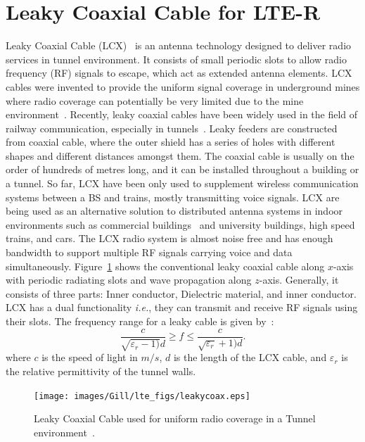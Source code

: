 \section{Leaky Coaxial Cable for LTE-R}
Leaky Coaxial Cable (LCX)~\cite{n1974leaky} is an antenna technology designed to deliver radio services in tunnel environment. It consists of small periodic slots to allow radio frequency (RF) signals to escape, which act as extended antenna elements. LCX cables were invented to provide the uniform signal coverage in underground mines where radio coverage can potentially be very limited due to the mine environment~\cite{arlter10}. Recently, leaky coaxial cables have been widely used in the field of railway communication, especially in tunnels~\cite{arlter10}. Leaky feeders are
constructed from coaxial cable, where the outer shield has a series of holes with different shapes and different distances amongst them. The coaxial cable is usually on the order of hundreds of metres long, and it can be installed throughout a building or a tunnel. So far, LCX have been only used to supplement wireless communication systems between a BS and trains, mostly transmitting voice signals. LCX are being used as an alternative solution to distributed antenna systems in indoor environments such as commercial buildings~\cite{motley1983directed,saleh1987distributed} and university buildings, high speed trains, and cars. The LCX radio system is almost noise free and has enough bandwidth to support multiple RF signals carrying voice and data simultaneously. Figure~\ref{fig:leakcoax} shows the conventional leaky coaxial cable along $x$-axis with periodic radiating slots and wave propagation along $z$-axis. Generally, it consists of three parts: Inner conductor, Dielectric material, and inner conductor. LCX has a dual functionality \textit{i.e.}, they can transmit and receive RF signals using their slots. The frequency range for a leaky cable is given by~\cite{cao1999radio}:
\begin{equation}
\dfrac{c}{\sqrt{\varepsilon_r-1)}d}\geq f \leq \dfrac{c}{\sqrt{\varepsilon_r}+1)d}.
\end{equation}
where $c$ is the speed of light in $m/s$, $d$ is the length of the LCX cable, and $\varepsilon_r$ is the relative permittivity of the tunnel walls.
\begin{figure}[!ht]
\centering
\texttt{[image: images/Gill/lte\_figs/leakycoax.eps]} 
\caption{Leaky Coaxial Cable used for uniform radio coverage in a Tunnel environment~\cite{arlter10}.}
\label{fig:leakcoax}
\end{figure}

